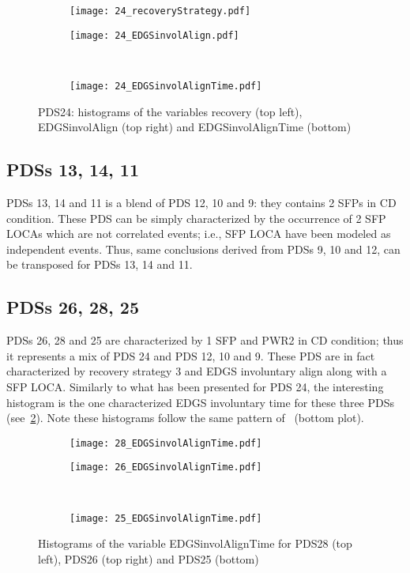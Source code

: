 \begin{figure}
  \begin{subfigure}{.5\linewidth}
    \centering
    \texttt{[image: 24\_recoveryStrategy.pdf]}
  \end{subfigure}%
  \begin{subfigure}{.5\linewidth}
    \centering
    \texttt{[image: 24\_EDGSinvolAlign.pdf]}
  \end{subfigure}\\[1ex]
  \begin{subfigure}{\linewidth}
    \centering
    \texttt{[image: 24\_EDGSinvolAlignTime.pdf]}
  \end{subfigure}
  \caption{PDS24: histograms of the variables recovery (top left), EDGSinvolAlign (top right) and EDGSinvolAlignTime (bottom)}
  \label{fig:histPDS_24}
\end{figure}

\subsection{PDSs 13, 14, 11}
PDSs 13, 14 and 11 is a blend of PDS 12, 10 and 9: they contains 2 SFPs in CD condition. These PDS can be simply characterized
by the occurrence of 2 SFP LOCAs which are not correlated events; i.e., SFP LOCA have been modeled as independent events.
Thus, same conclusions derived from PDSs 9, 10 and 12, can be transposed for PDSs 13, 14 and 11.

\subsection{PDSs 26, 28, 25}
PDSs 26, 28 and 25 are characterized by 1 SFP and PWR2 in CD condition; thus it represents a mix of PDS 24 and PDS 12, 10 and 9.
These PDS are in fact characterized by recovery strategy 3 and EDGS involuntary align along with a SFP LOCA.
Similarly to what has been presented for PDS 24, the interesting histogram is the one characterized EDGS involuntary time for 
these three PDSs (see~\ref{fig:histPDS_26_28_25_EDGSinvolAlignTime}). Note these histograms follow the same pattern 
of~\label{fig:histPDS_24} (bottom plot).

\begin{figure}
  \begin{subfigure}{.5\linewidth}
    \centering
    \texttt{[image: 28\_EDGSinvolAlignTime.pdf]}
  \end{subfigure}%
  \begin{subfigure}{.5\linewidth}
    \centering
    \texttt{[image: 26\_EDGSinvolAlignTime.pdf]}
  \end{subfigure}\\[1ex]
  \begin{subfigure}{\linewidth}
    \centering
    \texttt{[image: 25\_EDGSinvolAlignTime.pdf]}
  \end{subfigure}
  \caption{Histograms of the variable EDGSinvolAlignTime for PDS28 (top left), PDS26 (top right) and PDS25 (bottom)}
  \label{fig:histPDS_26_28_25_EDGSinvolAlignTime}
\end{figure}

